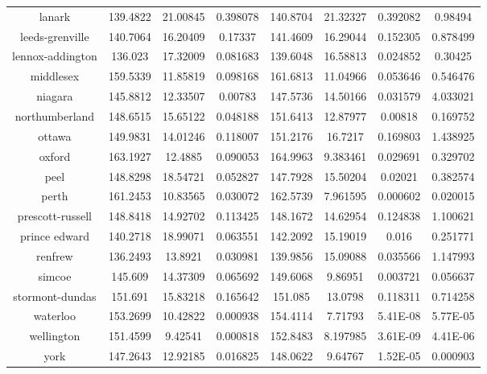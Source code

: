 \begin{table}[H]
\begin{tabular}{|c|ccc|ccc|c|}
lanark                    & 139.4822 & 21.00845 & 0.398078 & 140.8704 & 21.32327 & 0.392082 & 0.98494  \\
leeds-grenville           & 140.7064 & 16.20409 & 0.17337  & 141.4609 & 16.29044 & 0.152305 & 0.878499 \\
lennox-addington          & 136.023  & 17.32009 & 0.081683 & 139.6048 & 16.58813 & 0.024852 & 0.30425  \\
middlesex                 & 159.5339 & 11.85819 & 0.098168 & 161.6813 & 11.04966 & 0.053646 & 0.546476 \\
niagara                   & 145.8812 & 12.33507 & 0.00783  & 147.5736 & 14.50166 & 0.031579 & 4.033021 \\
northumberland            & 148.6515 & 15.65122 & 0.048188 & 151.6413 & 12.87977 & 0.00818  & 0.169752 \\
ottawa                    & 149.9831 & 14.01246 & 0.118007 & 151.2176 & 16.7217  & 0.169803 & 1.438925 \\
oxford                    & 163.1927 & 12.4885  & 0.090053 & 164.9963 & 9.383461 & 0.029691 & 0.329702 \\
peel                      & 148.8298 & 18.54721 & 0.052827 & 147.7928 & 15.50204 & 0.02021  & 0.382574 \\
perth                     & 161.2453 & 10.83565 & 0.030072 & 162.5739 & 7.961595 & 0.000602 & 0.020015 \\
prescott-russell          & 148.8418 & 14.92702 & 0.113425 & 148.1672 & 14.62954 & 0.124838 & 1.100621 \\
prince edward             & 140.2718 & 18.99071 & 0.063551 & 142.2092 & 15.19019 & 0.016    & 0.251771 \\
renfrew                   & 136.2493 & 13.8921  & 0.030981 & 139.9856 & 15.09088 & 0.035566 & 1.147993 \\
simcoe                    & 145.609  & 14.37309 & 0.065692 & 149.6068 & 9.86951  & 0.003721 & 0.056637 \\
stormont-dundas & 151.691  & 15.83218 & 0.165642 & 151.085  & 13.0798  & 0.118311 & 0.714258 \\
waterloo                  & 153.2699 & 10.42822 & 0.000938 & 154.4114 & 7.71793  & 5.41E-08 & 5.77E-05 \\
wellington                & 151.4599 & 9.42541  & 0.000818 & 152.8483 & 8.197985 & 3.61E-09 & 4.41E-06 \\
york                      & 147.2643 & 12.92185 & 0.016825 & 148.0622 & 9.64767  & 1.52E-05 & 0.000903
\\
\hline
\end{tabular}
\end{table}

